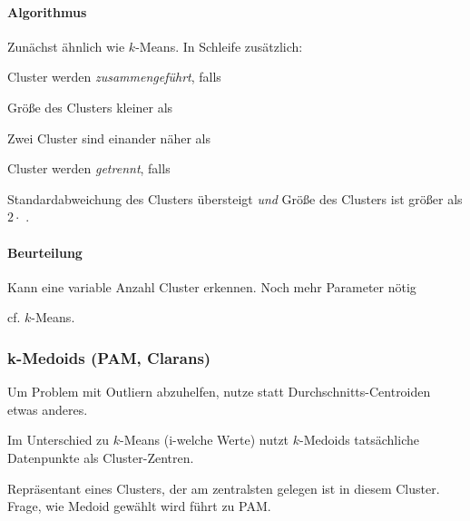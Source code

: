 \documentclass[10pt]{article} %
\begin{document}
 \paragraph{Algorithmus} Zunächst ähnlich wie $k$-Means. In Schleife zusätzlich:
 \begin{cptitemize} 
   	 \item Cluster werden \textit{zusammengeführt}, falls
   	 \begin{cptitemize} 
   	  	 \item Größe des Clusters kleiner als 
   	  	 \item Zwei Cluster sind einander näher als  
   	 \end{cptitemize} 
   	 \item Cluster werden \textit{getrennt}, falls
   	 \begin{cptitemize} 
   	  	 \item Standardabweichung des Clusters übersteigt  \textit{und} Größe des Clusters ist größer als $2 \cdot$ . 
   	 \end{cptitemize} 
  \end{cptitemize}  

\paragraph{Beurteilung}
\begin{cptitemize} 
	\advantageit Kann eine variable Anzahl Cluster erkennen.
  	\disadvantageit Noch mehr Parameter nötig
  	\item cf. $k$-Means.
 \end{cptitemize}  

\myhline

\subsubsection{k-Medoids (PAM, Clarans)}
Um Problem mit Outliern abzuhelfen, nutze statt Durchschnitts-Centroiden etwas anderes.

Im Unterschied zu $k$-Means (i-welche Werte) nutzt $k$-Medoids tatsächliche Datenpunkte als Cluster-Zentren.

\begin{definition}[Medoid] Repräsentant eines Clusters, der am zentralsten gelegen ist in diesem Cluster. Frage, wie Medoid gewählt wird führt zu PAM.
\end{definition} 

\begin{minipage}{0.5\columnwidth}
\end{minipage}
\begin{minipage}{0.49\columnwidth}
\end{minipage}
\end{document}
